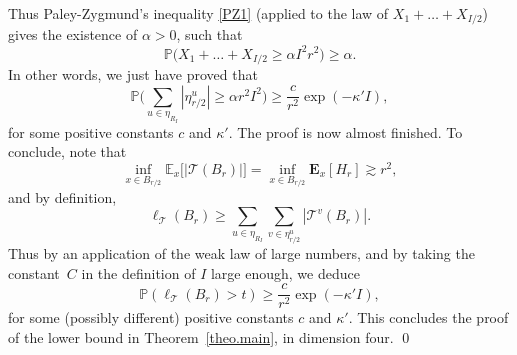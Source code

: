 \documentclass[11pt]{article}
\numberwithin{equation}{section}
\let\ts\textstyle
\theoremstyle{plain}
\theoremstyle{definition}
\newcommand\T{\mathcal{T}}
\newcommand{\1}{{\text{\Large $\mathfrak 1$}}}
\begin{document}
Thus Paley-Zygmund's inequality \eqref{PZ1} (applied to the law of $X_1+\dots + X_{I/2}$) gives the existence of $\alpha>0$, such that
\[
\mathbb P\big(X_1+\dots + X_{I/2} \ge \alpha I^2r^2\big) \ge \alpha.
\]
In other words, we just have proved that
\[
\mathbb P\big(\ts\sum_{u\in \eta_{R_I}}
|\eta^u_{r/2}|\ge \alpha r^2 I^2\big)\ge \dfrac{c}{r^2}\exp(-\kappa' I),
\]
for some positive constants $c$ and $\kappa'$. The proof is now almost finished. To conclude, note that
\[
\inf_{x\in B_{r/2}}\mathbb E_x\big[|\mathcal T(B_r)|\big] =
\inf_{x\in B_{r/2}} \mathbf E_x[H_r] \gtrsim r^2,
\]
and by definition,
\[
\ell_{\T}(B_r) \ge \sum_{u \in \eta_{R_I} }
\sum_{v \in \eta^u_{r/2} } |\mathcal T^v(B_r)|.
\]
Thus by an application of the weak law of large numbers, and by taking the constant~$C$ in the definition of $I$ large enough, we deduce
\[
\mathbb P(\ell_{\T}(B_r)>t) \geq \frac{c}{r^2} \exp(- \kappa' I),
\]
for some (possibly different) positive constants $c$ and $\kappa'$. This concludes the proof of the lower bound in Theorem~\ref{theo.main}, in dimension four. \qed

\end{document}
